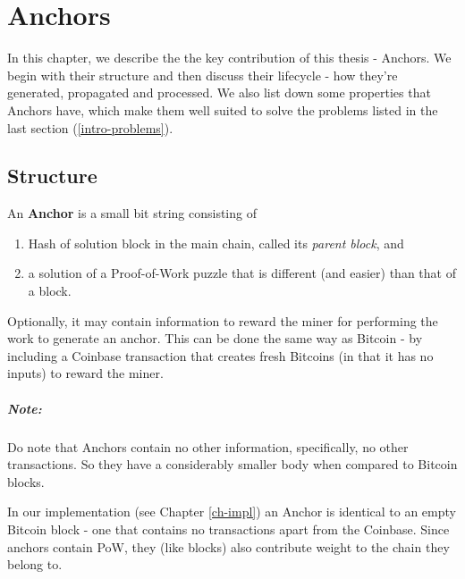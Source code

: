 \chapter{Anchors} \label{ch-anchors}

In this chapter, we describe the the key contribution of this thesis - Anchors. We begin with their structure and then discuss their lifecycle - how they're generated, propagated and processed. 
We also list down some properties that Anchors have, which make them well suited to solve the problems listed in the last section (\ref{intro-problems}).


\section{Structure} \label{anc-structure}

An \textbf{Anchor} is a small bit string consisting of 

\begin{enumerate}[i]
    \item Hash of solution block in the main chain, called its \textit{parent block}, and 
    \item a solution of a Proof-of-Work puzzle that is different (and easier) than that of a block.
\end{enumerate}

Optionally, it may contain information to reward the miner for performing the work to generate an anchor.
This can be done the same way as Bitcoin - by including a Coinbase transaction that creates fresh Bitcoins (in that it has no inputs) to reward the miner.

\paragraph{Note: } Do note that Anchors contain no other information, specifically, no other transactions. 
So they have a considerably smaller body when compared to Bitcoin blocks.


In our implementation (see Chapter \ref{ch-impl}) an Anchor is identical to an empty Bitcoin block - one that contains no transactions apart from the Coinbase.
Since anchors contain PoW, they (like blocks) also contribute weight to the chain they belong to.

